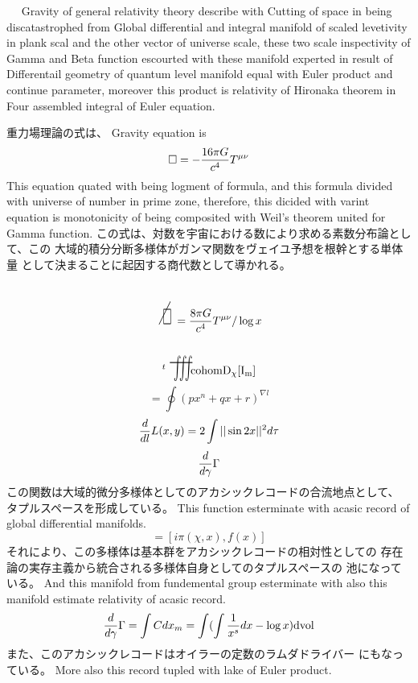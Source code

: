 \documentclass{jsarticle}
\begin{document}
  　 Gravity of general relativity theory describe with Cutting of space
in being discatastrophed from Global differential and integral manifold
of scaled levetivity in plank scal and the other vector of universe
scale, these two scale inspectivity of Gamma and Beta function escourted
with these manifold experted in result of Differentail geometry of
quantum level manifold equal with Euler product and continue parameter,
moreover this product is relativity of Hironaka theorem in Four assembled
integral of Euler equation.

 重力場理論の式は、
  Gravity equation is
  $$ \square = - {16 \pi G \over c^4}T^{\mu\nu} $$
  This equation quated with being logment of formula, and
  this formula divided with universe of number in prime zone,
  therefore, this dicided with varint equation is monotonicity of
  being composited with Weil's theorem united for Gamma function.
  この式は、対数を宇宙における数により求める素数分布論として、この
  大域的積分分断多様体がガンマ関数をヴェイユ予想を根幹とする単体量
  として決まることに起因する商代数として導かれる。
  $$ \scalebox{1}[2]{\alearletter} = 
  {{{{8 \pi G} \over {c^4}}T^{\mu\nu}}/ \log x} $$
  $$ {}^{t}\scalebox{1}[2]{\variiint}\mathrm{cohom D_{\chi}[I_m]}$$
  $$ = \oint {(px^n + qx + r)^{\nabla l}} $$
  $$ {d \over d l}L(x,y) = 2 \int ||\sin 2x||^{2}d \tau $$
  $$ {d \over d \gamma}\Gamma $$
  この関数は大域的微分多様体としてのアカシックレコードの合流地点として、
  タプルスペースを形成している。
  This function esterminate with acasic record of global differential
  manifolds.
  $$ = [i \pi (\chi, x), f(x)] $$
  それにより、この多様体は基本群をアカシックレコードの相対性としての
  存在論の実存主義から統合される多様体自身としてのタプルスペースの
  池になっている。
  And this manifold from fundemental group esterminate with
  also this manifold estimate relativity of acasic record.
  $$ {d \over d \gamma}\Gamma = \int C dx_m = \int(\int {1 \over x^s}dx
  - \log x)\mathrm{dvol} $$
  また、このアカシックレコードはオイラーの定数のラムダドライバー
  にもなっている。
  More also this record tupled with lake of Euler product.
\end{document}
